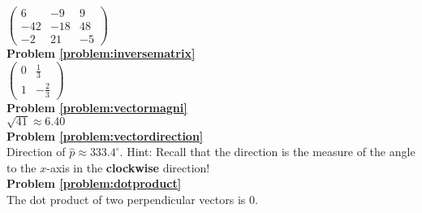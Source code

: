 $
\begin{pmatrix}
6 & -9 & 9 \\
-42 & -18 & 48 \\
-2 & 21 & -5 
\end{pmatrix}
$
\\
\textbf{Problem \ref{problem:inversematrix}} \\
$
\begin{pmatrix}
0 & \frac{1}{3} \\
1 & -\frac{2}{3}
\end{pmatrix}
$
\\
\textbf{Problem \ref{problem:vectormagni}} \\
$\sqrt{41} \approx 6.40$ 
\\
\textbf{Problem \ref{problem:vectordirection}} \\
Direction of $\hat{p}\approx 333.4^{\circ}$. Hint: Recall that the direction is the measure of the angle to the $x$-axis in the \textbf{clockwise} direction!
\\
\textbf{Problem \ref{problem:dotproduct}} \\
The dot product of two perpendicular vectors is $0$. 







